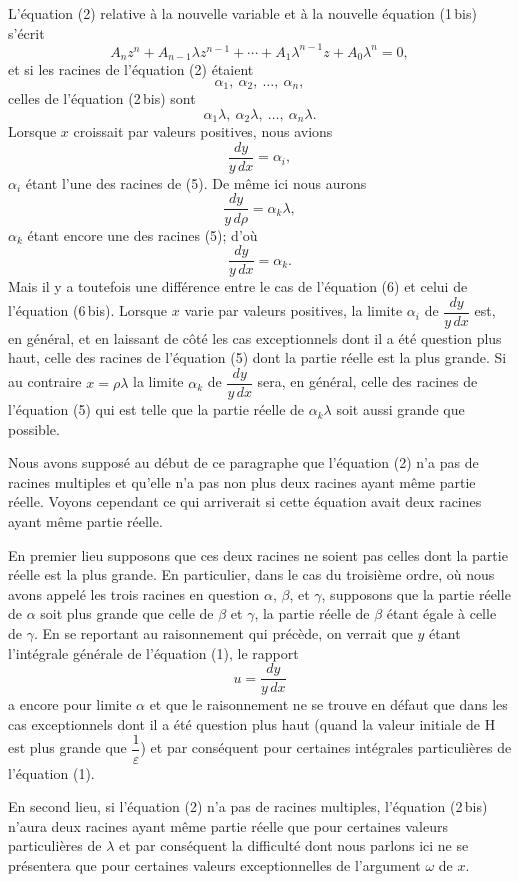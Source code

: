 \documentclass[11pt]{article}
\begin{document}
L'équation (2) relative à la nouvelle variable et à la nouvelle équation (1\,bis) s'écrit
\[
\tag{2\,bis}
A_nz^n+A_{n-1}\lambda z^{n-1}+\cdots+A_1\lambda^{n-1}z+A_0\lambda^n=0,
\]
et si les racines de l'équation (2) étaient
\[
\tag{5}
\alpha_1,\ \alpha_2,\ \ldots,\ \alpha_n,
\]
celles de l'équation (2\,bis) sont
\[
\alpha_1\lambda,\ \alpha_2\lambda,\ \ldots,\ \alpha_n\lambda.
\]
Lorsque $x$ croissait par valeurs positives, nous avions
\[
\tag{6}
\frac{dy}{y\,dx}=\alpha_i,
\]
$\alpha_i$ étant l'une des racines de (5). De même ici nous aurons
\[
\frac{dy}{y\,d\rho}=\alpha_k\lambda,
\]
$\alpha_k$ étant encore une des racines (5); d'où
\[
\tag{6\,bis}
\frac{dy}{y\,dx}=\alpha_k.
\]
Mais il y a toutefois une différence entre le cas de l'équation (6) et celui de l'équation (6\,bis). Lorsque $x$ varie par valeurs positives, la limite $\alpha_i$ de $\dfrac{dy}{y\,dx}$ est, en général, et en laissant de côté les cas exceptionnels dont il a été question plus haut, celle des racines de l'équation (5) dont la partie réelle est la plus grande. Si au contraire $x=\rho\lambda$ la limite $\alpha_k$ de $\dfrac{dy}{y\,dx}$ sera, en général, celle des racines de l'équation (5) qui est telle que la partie réelle de $\alpha_k\lambda$ soit aussi grande que possible.

Nous avons supposé au début de ce paragraphe que l'équation (2) n'a pas de racines multiples et qu'elle n'a pas non plus deux racines ayant même partie réelle. Voyons cependant ce qui arriverait si cette équation avait deux racines ayant même partie réelle.

En premier lieu supposons que ces deux racines ne soient pas celles dont la partie réelle est la plus grande. En particulier, dans le cas du troisième ordre, où nous avons appelé les trois racines en question $\alpha$, $\beta$, et $\gamma$, supposons que la partie réelle de $\alpha$ soit plus grande que celle de $\beta$ et $\gamma$, la partie réelle de $\beta$ étant égale à celle de $\gamma$. En se reportant au raisonnement qui précède, on verrait que $y$ étant l'intégrale générale de l'équation (1), le rapport
\[
u=\frac{dy}{y\,dx}
\]
a encore pour limite $\alpha$ et que le raisonnement ne se trouve en défaut que dans les cas exceptionnels dont il a été question plus haut (quand la valeur initiale de H est plus grande que $\dfrac1\varepsilon$) et par conséquent pour certaines intégrales particulières de l'équation (1).

En second lieu, si l'équation (2) n'a pas de racines multiples, l'équation (2\,bis) n'aura deux racines ayant même partie réelle que pour certaines valeurs particulières de $\lambda$ et par conséquent la difficulté dont nous parlons ici ne se présentera que pour certaines valeurs exceptionnelles de l'argument $\omega$ de $x$.
\end{document}
